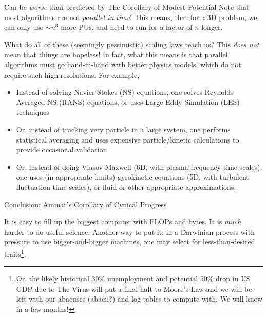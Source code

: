 \documentclass[aspectratio=169]{beamer}
\newcommand{\mypause}{}
\begin{document}
\begin{frame}{Can be \emph{worse} than predicted by The
    Corollary of Modest Potential}
  Note that most algorithms are not \emph{parallel in time}! This
  means, that for a 3D problem, we can only use $\sim n^3$ more PUs,
  and need to run for a factor of $n$ longer.
\end{frame}

\begin{frame}{What do all of these (seemingly pessimistic) scaling
    laws teach us?}
  This \emph{does not} mean that things are hopeless! In fact, what
  this means is that parallel algorithms must go hand-in-hand with
  better physics models, which do not require such high
  resolutions. For example, 
  \begin{itemize}
  \item Instead of solving Navier-Stokes (NS) equations, one solves
    Reynolds Averaged NS (RANS) equations, or uses Large Eddy
    Simulation (LES) techniques%
    \mypause%
  \item Or, instead of tracking very particle in a large system, one
    performs statistical averaging and uses expensive particle/kinetic
    calculations to provide occasional validation
    \mypause%
  \item Or, instead of doing Vlasov-Maxwell (6D, with plasma frequency
    time-scales), one uses (in appropriate limits) gyrokinetic
    equations (5D, with turbulent fluctuation time-scales), or fluid
    or other appropriate approximations.
  \end{itemize}%
\end{frame}

\begin{frame}{Conclusion: Ammar's Corollary of Cynical Progress}

  {\color{blue} It is easy to fill up the biggest computer with FLOPs
    and bytes. It is \emph{much} harder to do useful science.}%
  \vskip0.1in%
  Another way to put it: in a Darwinian process with pressure to use
  bigger-and-bigger machines, one may select for less-than-desired
  traits\footnote{Or, the likely historical 30\% unemployment and
    potential 50\% drop in US GDP due to The Virus will put a final
    halt to Moore's Law and we will be left with our abacuses
    (abacii?) and log tables to compute with. We will know in a few
    months!}.
\end{frame}
\end{document}

